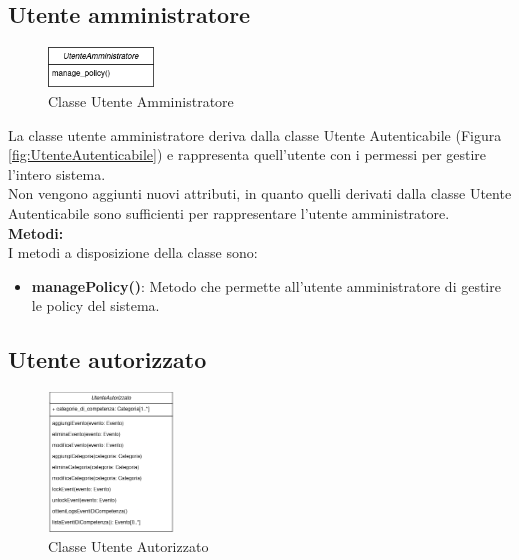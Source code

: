 \documentclass{article}
\begin{document}
\clearpage

\subsection{Utente amministratore}

\begin{figure}[htbp]
	\centering
	\includegraphics[width=0.25\textwidth]{Images/UtenteAmministratore-Class.png}
	\caption{Classe Utente Amministratore}
	\label{fig:utente_amministratore}
\end{figure}

La classe utente amministratore deriva dalla classe Utente Autenticabile (Figura \ref{fig:UtenteAutenticabile}) e rappresenta quell'utente con i permessi per gestire l'intero sistema.\\

Non vengono aggiunti nuovi attributi, in quanto quelli derivati dalla classe Utente Autenticabile sono sufficienti per rappresentare l'utente amministratore.\\

\textbf{Metodi:}\\
I metodi a disposizione della classe sono:

\begin{itemize}
	\item \textbf{managePolicy()}: Metodo che permette all'utente amministratore di gestire le policy del sistema.
\end{itemize}

\subsection{Utente autorizzato}

\begin{figure}[htbp]
	\centering
	\includegraphics[width=0.3\textwidth]{Images/UtenteAutorizzato-Class.png}
	\caption{Classe Utente Autorizzato}
	\label{fig:utente_autorizzato}
\end{figure}
\end{document}
